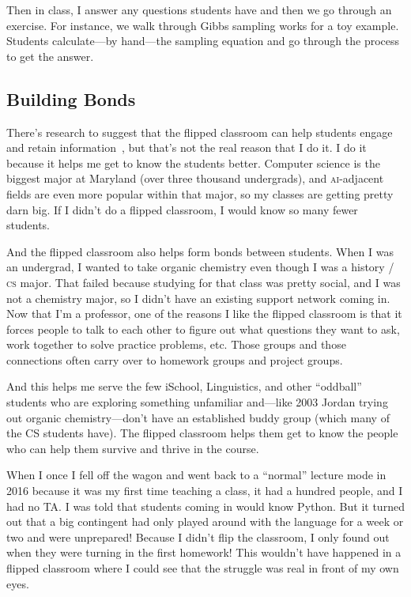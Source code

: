 \documentclass[11pt]{amsart}
\newcommand{\abr}[1]{\textsc{#1}}
\begin{document}
Then in class, I answer any questions students have and then we go
through an exercise.
%
For instance, we walk through Gibbs sampling
works for a toy example.
%
Students calculate---by hand---the sampling
equation and go through the process to get the answer.

%

\subsection{Building Bonds}

There's research to suggest that the flipped classroom can help
students engage and retain information~\cite{Zuber-16}, but that's not
the real reason that I do it.
%
I do it because it helps me get to know the students better.  Computer
science is the biggest major at Maryland (over three thousand undergrads), and
\abr{ai}-adjacent fields are even more popular within that major, so my
classes are getting pretty darn big.
%
If I didn't do a flipped
classroom, I would know so many fewer students.

And the flipped classroom also helps form bonds between students.
%
When I was an undergrad, I wanted to take organic chemistry even
though I was a history / \abr{cs} major.
%
That failed because studying for
that class was pretty social, and I was not a chemistry major, so I
didn't have an existing support network coming in.
%
Now that I'm a
professor, one of the reasons I like the flipped classroom is that it
forces people to talk to each other to figure out what questions they
want to ask, work together to solve practice problems, etc.
%
Those
groups and those connections often carry over to homework groups and
project groups.

And this helps me serve the few iSchool, Linguistics, and other ``oddball''
students who are exploring something unfamiliar and---like 2003 Jordan trying out
organic chemistry---don't have an established buddy group (which many of the
CS students have).  The flipped classroom helps them get to know the people
who can help them survive and thrive in the course.

When I once I fell off the wagon and went back to a ``normal'' lecture
mode in 2016 because it was my first time teaching a class, it had a
hundred people, and I had no TA.  I was told that students coming in
would know Python.  But it turned out that a big contingent had only
played around with the language for a week or two and were unprepared!
Because I didn't flip the classroom, I only found out when they were turning in the first homework! This wouldn't have happened in a flipped classroom where
I could see that the struggle was real in front of my own eyes.
\end{document}
